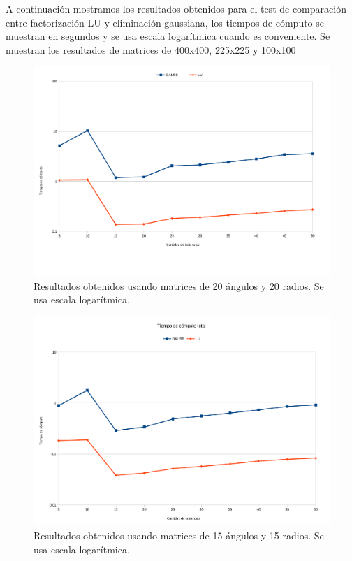 A continuación mostramos los resultados obtenidos para el test de comparación entre factorización LU y eliminación gaussiana, los tiempos de cómputo se muestran en segundos y se usa escala logarítmica cuando es conveniente. Se muestran los resultados de matrices de 400x400, 225x225 y 100x100 


\begin{figure}[H]{}
\centering
\includegraphics[scale=0.5]{graphs/gaussVsLU1.pdf}
\caption{Resultados obtenidos usando matrices de 20 ángulos y 20 radios. Se usa escala logarítmica.}
\label{gaussVsLU1}
\end{figure}

\begin{figure}[H]{}
\centering
\includegraphics[scale=0.5]{graphs/gaussVsLU2.pdf}
\caption{Resultados obtenidos usando matrices de 15 ángulos y 15 radios. Se usa escala logarítmica.}
\label{gaussVsLU1}
\end{figure}

